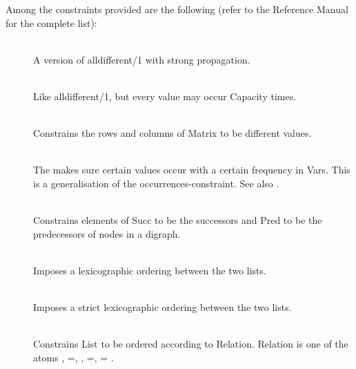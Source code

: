 Among the constraints provided are the following (refer to the
Reference Manual for the complete list):

\begin{description}
\item[]\ \\
A version of alldifferent/1 with strong propagation.

\item[]\ \\
Like alldifferent/1, but every value may occur Capacity times.

\item[]\ \\
Constrains the rows and columns of Matrix to be different values.

\item[]\ \\
The  makes sure certain values
occur with a certain frequency in Vars.  This is a generalisation of the
occurrences-constraint.
See also .

\item[]\ \\
Constrains elements of Succ to be the successors and Pred to be the
predecessors of nodes in a digraph.

\item[]\ \\
Imposes a lexicographic ordering between the two lists.

\item[]\ \\
Imposes a strict lexicographic ordering between the two lists.

\item[]\ \\
Constrains List to be ordered according to Relation.
Relation is one of the atoms \lt, =\lt, \gt, \gt=, = .


\end{description}
